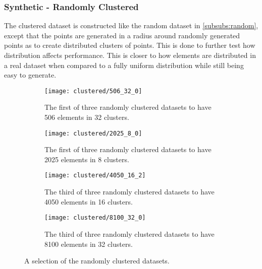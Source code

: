 \subsubsection{Synthetic - Randomly Clustered}
\label{subsubs:clustered}

The clustered dataset is constructed like the random dataset in \autoref{subsubs:random}, except that the points are generated in a radius around randomly generated points as to create distributed clusters of points. This is done to further test how distribution affects performance. This is closer to how elements are distributed in a real dataset when compared to a fully uniform distribution while still being easy to generate.

\begin{figure}[H]
    \centering
    \begin{subfigure}{0.458\textwidth}
        \texttt{[image: clustered/506\_32\_0]}
        \caption[The first of three randomly clustered datasets to have 506 elements in 32 clusters.]{The first of three randomly clustered datasets to have 506 elements in 32 clusters.}
        \label{fig:clustered506_32_0}
    \end{subfigure}\hfill
    \begin{subfigure}{0.458\textwidth}
        \texttt{[image: clustered/2025\_8\_0]}
        \caption[The first of three randomly clustered datasets to have 2025 elements in 8 clusters.]{The first of three randomly clustered datasets to have 2025 elements in 8 clusters.}
        \label{fig:clustered2025_8_0}
    \end{subfigure}\hfill
    \begin{subfigure}{0.458\textwidth}
        \texttt{[image: clustered/4050\_16\_2]}
        \caption[The third of three randomly clustered datasets to have 4050 elements in 16 clusters.]{The third of three randomly clustered datasets to have 4050 elements in 16 clusters.}
        \label{fig:clustered4050_16_2}
    \end{subfigure}\hfill
    \begin{subfigure}{0.458\textwidth}
        \texttt{[image: clustered/8100\_32\_0]}
        \caption[The first of three randomly clustered datasets to have 8100 elements in 32 clusters.]{The third of three randomly clustered datasets to have 8100 elements in 32 clusters.}
        \label{fig:clustered8100_32_0}
    \end{subfigure}
    \caption[A selection of the randomly clustered datasets.]{A selection of the randomly clustered datasets.}
    \label{fig:clustered}
\end{figure}

